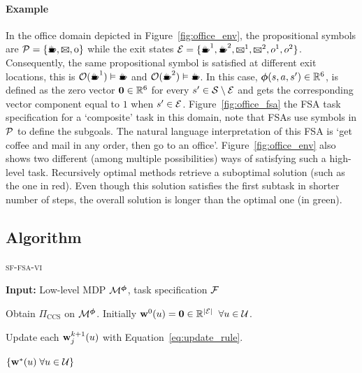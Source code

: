  \paragraph{Example} In the office domain depicted in Figure~\ref{fig:office_env}, the propositional symbols are $\cP=\{\text{\coffee}, \text{\mail}, \text{o}\}$ while the exit states $\cE=\{\text{\coffee}^1, \text{\coffee}^2,\text{\mail}^1,\text{\mail}^2,o^1,o^2\}$. Consequently, the same propositional symbol is satisfied at different exit locations, this is $\cO(\text{\coffee}^1)\vDash\text{\coffee}$ and $\cO(\text{\coffee}^2)\vDash\text{\coffee}$. In this case, $\boldsymbol\phi(s, a, s')\in\mathbb{R}^6$, is defined as the zero vector $\mathbf{0}\in\mathbb{R}^6$ for every $s'\in\mathcal{S}\setminus\mathcal{E}$ and gets the corresponding vector component equal to $1$ when $s'\in\mathcal{E}$. Figure~\ref{fig:office_fsa} the FSA task specification for a `composite' task in this domain, note that FSAs use symbols in $\mathcal{P}$ to define the subgoals. The natural language interpretation of this FSA is `get coffee and mail in any order, then go to an office'. Figure~\ref{fig:office_env} also shows two different (among multiple possibilities) ways of satisfying such a high-level task. Recursively optimal methods retrieve a suboptimal solution (such as the one in red). Even though this solution satisfies the first subtask in shorter number of steps, the overall solution is longer than the optimal one (in green).

\subsection{Algorithm} 

\begin{algorithm}[!htb]
  \caption{\textsc{sf-fsa-vi}}
  \textbf{Input:} Low-level MDP $\mathcal{M}^{\boldsymbol{\phi}}$, task specification $\mathcal{F}$
  \begin{algorithmic}[1]
    \State Obtain $\Pi_\text{CCS}$ on $\mathcal{M}^{\boldsymbol{\phi}}$.
    \State Initially  $\mathbf{w}^0(u) = \mathbf{0} \in\mathbb{R}^{\lvert\mathcal{E}\rvert}\;\;\forall u\in\mathcal{U}$.
   
        
        \State Update each $\mathbf{w}^{k+1}_j{(u)}$ with Equation~\eqref{eq:update_rule}.
       
      \EndFor
    \EndWhile
    
    \State \Return $\{\mathbf{w}^*(u)\;\forall u\in\mathcal{U}\}$
  \end{algorithmic}
  \label{alg:online}
\end{algorithm}


